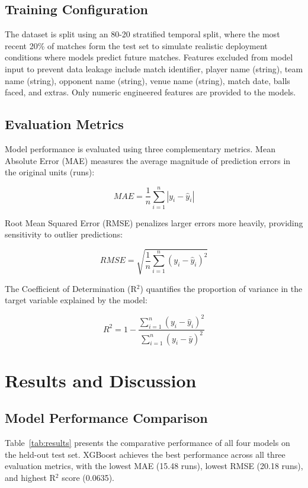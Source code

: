 \documentclass[conference]{IEEEtran}
\begin{document}
\subsection{Training Configuration}
The dataset is split using an 80-20 stratified temporal split, where the most recent 20\% of matches form the test set to simulate realistic deployment conditions where models predict future matches. Features excluded from model input to prevent data leakage include match identifier, player name (string), team name (string), opponent name (string), venue name (string), match date, balls faced, and extras. Only numeric engineered features are provided to the models.

\subsection{Evaluation Metrics}
Model performance is evaluated using three complementary metrics. Mean Absolute Error (MAE) measures the average magnitude of prediction errors in the original units (runs):

\begin{equation}
MAE = \frac{1}{n} \sum_{i=1}^{n} |y_i - \hat{y}_i|
\label{eq:mae}
\end{equation}

Root Mean Squared Error (RMSE) penalizes larger errors more heavily, providing sensitivity to outlier predictions:

\begin{equation}
RMSE = \sqrt{\frac{1}{n} \sum_{i=1}^{n} (y_i - \hat{y}_i)^2}
\label{eq:rmse}
\end{equation}

The Coefficient of Determination (R\(^2\)) quantifies the proportion of variance in the target variable explained by the model:

\begin{equation}
R^2 = 1 - \frac{\sum_{i=1}^{n} (y_i - \hat{y}_i)^2}{\sum_{i=1}^{n} (y_i - \bar{y})^2}
\label{eq:r2}
\end{equation}

\section{Results and Discussion}
\subsection{Model Performance Comparison}
Table~\ref{tab:results} presents the comparative performance of all four models on the held-out test set. XGBoost achieves the best performance across all three evaluation metrics, with the lowest MAE (15.48 runs), lowest RMSE (20.18 runs), and highest R\(^2\) score (0.0635).
\end{document}
